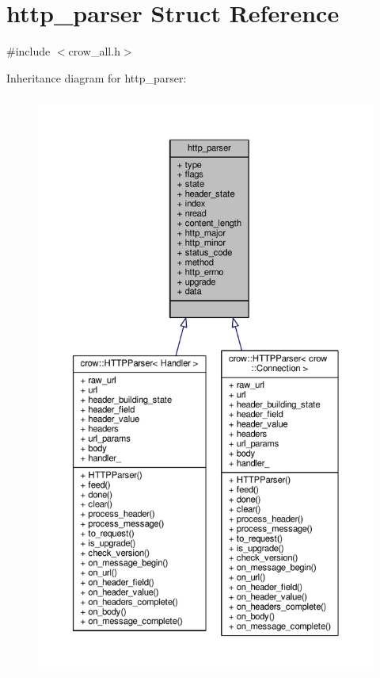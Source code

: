 \hypertarget{structhttp__parser}{\section{http\-\_\-parser Struct Reference}
\label{structhttp__parser}
}


{\ttfamily \#include $<$crow\-\_\-all.\-h$>$}



Inheritance diagram for http\-\_\-parser\-:
\nopagebreak
\begin{figure}[H]
\begin{center}
\leavevmode
\includegraphics[height=550pt]{structhttp__parser__inherit__graph}
\end{center}
\end{figure}


